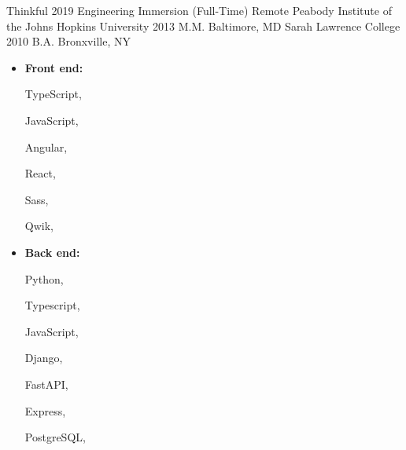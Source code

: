 
\begin{itemize}[label={}, leftmargin=*]
            \education
        {Thinkful}
        {2019}
        {Engineering Immersion (Full-Time)}
        {Remote}
                \education
        {Peabody Institute of the Johns Hopkins University}
        {2013}
        {M.M.}
        {Baltimore, MD}
                \education
        {Sarah Lawrence College}
        {2010}
        {B.A.}
        {Bronxville, NY}
        \end{itemize}


\begin{itemize}[label={}, leftmargin=*, nosep]
                \item \textbf{Front end:}
                      \begin{small}%
                TypeScript,%
            \end{small}
                      \begin{small}%
                JavaScript,%
            \end{small}
                      \begin{small}%
                Angular,%
            \end{small}
                      \begin{small}%
                React,%
            \end{small}
                      \begin{small}%
                Sass,%
            \end{small}
                      \begin{small}%
                Qwik,%
            \end{small}
                                  \item \textbf{Back end:}
                      \begin{small}%
                Python,%
            \end{small}
                      \begin{small}%
                Typescript,%
            \end{small}
                      \begin{small}%
                JavaScript,%
            \end{small}
                      \begin{small}%
                Django,%
            \end{small}
                      \begin{small}%
                FastAPI,%
            \end{small}
                      \begin{small}%
                Express,%
            \end{small}
                      \begin{small}%
                PostgreSQL,%
            \end{small}
                              \end{itemize}
